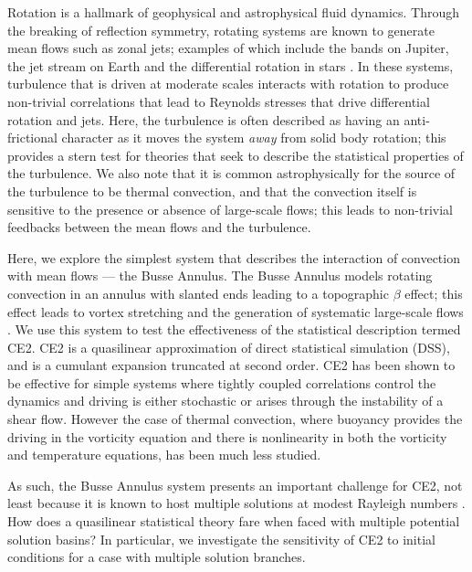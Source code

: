 \documentclass{jfm}
\begin{document}
Rotation is a hallmark of geophysical and astrophysical fluid dynamics.
Through the breaking of reflection symmetry, rotating systems are known to generate mean flows such as zonal jets; examples of which include the bands on Jupiter, the jet stream on Earth and the differential rotation in stars \citep{galperin_read_2019}.
In these systems, turbulence that is driven at moderate scales interacts with rotation to produce non-trivial correlations that lead to Reynolds stresses that drive differential rotation and jets. Here, the turbulence is often described as having an anti-frictional character as it moves the system \textit{away} from solid body rotation; this provides a stern test for theories that seek to describe the statistical properties of the turbulence. We also note that it is common astrophysically for the source of the turbulence to be thermal convection, and that the convection itself is sensitive to the presence or absence of large-scale flows; this leads to non-trivial feedbacks between the mean flows and the turbulence.


Here, we explore the simplest system that describes the interaction of convection with mean flows --- the Busse Annulus. The Busse Annulus models rotating convection in an annulus with slanted ends leading to a topographic $\beta$ effect; this effect leads to vortex stretching and the generation of systematic large-scale flows 
\citep[see e.g.][]{1976Icar...29..255B,bh1993,rj2006}. We use this system to test the effectiveness of the statistical description termed CE2. CE2 is a quasilinear approximation of direct statistical simulation (DSS), and is a cumulant expansion truncated at second order. CE2 has been shown to be effective for simple systems where tightly coupled correlations control the dynamics and driving is either stochastic or arises through the instability of a shear flow. However the case of thermal convection, where buoyancy provides the driving in the vorticity equation and there is nonlinearity in both the vorticity and temperature equations, has been much less studied. 




As such, the Busse Annulus system presents an important challenge for CE2, not least because it is known to host multiple solutions at modest Rayleigh numbers \citep{bh1993}.
How does a quasilinear statistical theory fare when faced with multiple potential solution basins?
In particular, we investigate the sensitivity of CE2 to initial conditions for a case with multiple solution branches.
\end{document}
